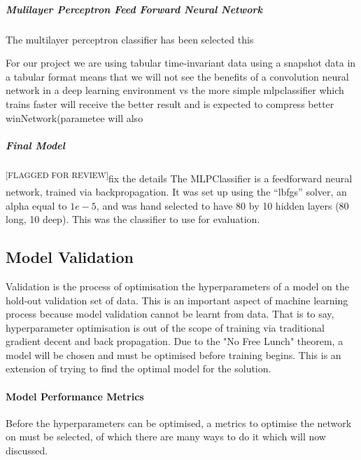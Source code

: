 \documentclass{UoNMCHA}
\newcommand{\flagforreview}{\textsuperscript{\color{red} [FLAGGED FOR REVIEW]}}
\newcommand{\inlineQuote}[1]{``#1''}
\numberwithin{equation}{section}
\begin{document}
\subparagraph{Mulilayer Perceptron Feed Forward Neural Network}
The multilayer perceptron classifier has been selected this

For our project we are using tabular time-invariant data using a snapshot data in a tabular format means that we will not see the benefits of a convolution neural network in a deep learning environment vs the more simple mlpclassifier which trains faster will receive the better result and is expected to compress better winNetwork(parametee will also

\subparagraph{Final Model} \flagforreview fix the details
The MLPClassifier is a feedforward neural network, trained via backpropagation. It was set up using the \inlineQuote{lbfgs} solver, an alpha equal to $1e-5$, and was hand selected to have 80 by 10 hidden layers (80 long, 10 deep). This was the classifier to use for evaluation.



\subsection{Model Validation}\label{subsec:ModelVal}
Validation is the process of optimisation the hyperparameters of a model on the hold-out validation set of data. This is an important aspect of machine learning process because model validation cannot be learnt from data. That is to say, hyperparameter optimisation is out of the scope of training via traditional gradient decent and back propagation. Due to the "No Free Lunch" theorem, a model will be chosen and must be optimised before training begins. This is an extension of trying to find the optimal model for the solution. 

\paragraph{Model Performance Metrics}
Before the hyperparameters can be optimised, a metrics to optimise the network on must be selected, of which there are many ways to do it which will now discussed. \\
\end{document}
